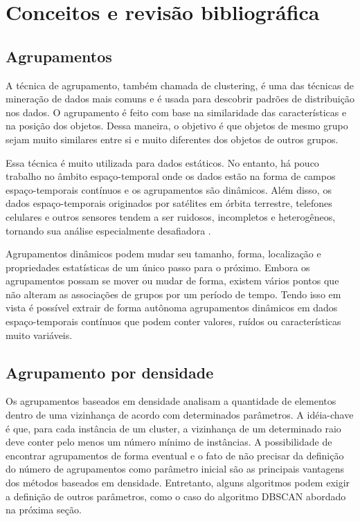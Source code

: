 \chapter{Conceitos e revisão bibliográfica}
\label{cap:estadodaarte}

\section{Agrupamentos}

A técnica de agrupamento, também chamada de clustering, é uma das técnicas de mineração de dados mais comuns e é usada para descobrir padrões de distribuição nos dados. O agrupamento é feito com base na similaridade das características e na posição dos objetos. Dessa maneira, o objetivo é que objetos de mesmo grupo sejam muito similares entre si e muito diferentes dos objetos de outros grupos.

Essa técnica é muito utilizada para dados estáticos. No entanto, há pouco trabalho no âmbito espaço-temporal onde os dados estão na forma de campos espaço-temporais contínuos e os agrupamentos são dinâmicos. Além disso, os dados espaço-temporais originados por satélites em órbita terrestre, telefones celulares e outros sensores tendem a ser ruidosos, incompletos e heterogêneos, tornando sua análise especialmente desafiadora \cite{faghmous2013}.

Agrupamentos dinâmicos podem mudar seu tamanho, forma, localização e propriedades estatísticas de um único passo para o próximo. Embora os agrupamentos possam se mover ou mudar de forma, existem vários pontos que não alteram as associações de grupos por um período de tempo. Tendo isso em vista é possível extrair de forma autônoma agrupamentos dinâmicos em dados espaço-temporais contínuos que podem conter valores, ruídos ou características muito variáveis.

\section{Agrupamento por densidade}

Os agrupamentos baseados em densidade analisam a quantidade de elementos dentro de uma vizinhança de acordo com determinados parâmetros. A idéia-chave é que, para cada instância de um cluster, a vizinhança de um determinado raio deve conter pelo menos um número mínimo de instâncias.
A possibilidade de encontrar agrupamentos de forma eventual e o fato de não precisar da definição do número de agrupamentos \cite{yip2005} como parâmetro inicial são as principais vantagens dos métodos baseados em densidade. Entretanto, alguns algoritmos podem exigir a definição de outros parâmetros, como o caso do algoritmo DBSCAN \cite{density-based-clusters} abordado na próxima seção.

